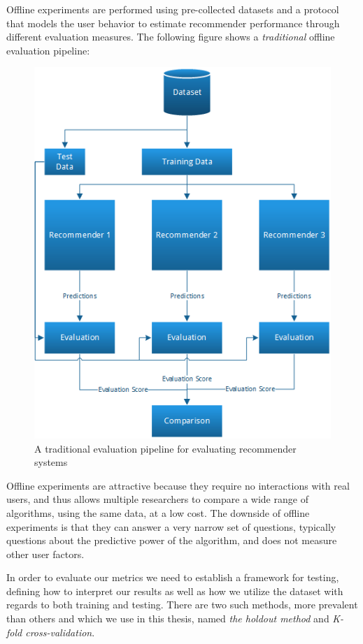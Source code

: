 Offline experiments are performed using pre-collected datasets and a protocol
that models the user behavior to estimate recommender performance through
different evaluation measures. The following figure shows a \emph{traditional}
offline evaluation pipeline:

\begin{figure}[H]
		\centering
	  	\includegraphics[scale=0.6]{image/evaluationpipeline.png}
		\caption[A Traditional Evaluation Pipeline]{A traditional evaluation pipeline for evaluating recommender systems}
		\label{figure:evaluationpipeline}
\end{figure}

Offline experiments are attractive because they require no interactions with
real users, and thus allows multiple researchers to compare a wide range of
algorithms, using the same data, at a low cost. The downside of offline
experiments is that they can answer a very narrow set of questions, typically
questions about the predictive power of the algorithm, and does not measure
other user factors.

In order to evaluate our metrics we need to establish a framework for testing,
defining how to interpret our results as well as how we utilize the dataset
with regards to both training and testing. There are two such methods, more
prevalent than others and which we use in this thesis, named \textit{the
holdout method} and \textit{K-fold cross-validation}.


